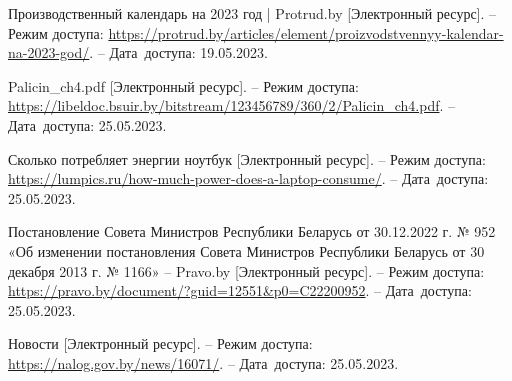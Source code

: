 \begin{thebibliography}{}

    Производственный календарь на 2023 год | Protrud.by
    [Электронный ресурс].
    -- Режим доступа: \url{https://protrud.by/articles/element/proizvodstvennyy-kalendar-na-2023-god/}.
    -- Дата~доступа: 19.05.2023.

    Palicin\_ch4.pdf
    [Электронный ресурс].
    -- Режим доступа: \url{https://libeldoc.bsuir.by/bitstream/123456789/360/2/Palicin_ch4.pdf}.
    -- Дата~доступа: 25.05.2023.

    Сколько потребляет энергии ноутбук
    [Электронный ресурс].
    -- Режим доступа: \url{https://lumpics.ru/how-much-power-does-a-laptop-consume/}.
    -- Дата~доступа: 25.05.2023.
    
    Постановление Совета Министров Республики Беларусь от 30.12.2022 г. № 952 «Об изменении постановления Совета Министров Республики Беларусь от 30 декабря 2013 г. № 1166» – Pravo.by
    [Электронный ресурс].
    -- Режим доступа: \url{https://pravo.by/document/?guid=12551&p0=C22200952}.
    -- Дата~доступа: 25.05.2023.

    Новости
    [Электронный ресурс].
    -- Режим доступа: \url{https://nalog.gov.by/news/16071/}.
    -- Дата~доступа: 25.05.2023.
\end{thebibliography}
\endgroup

\newpage
